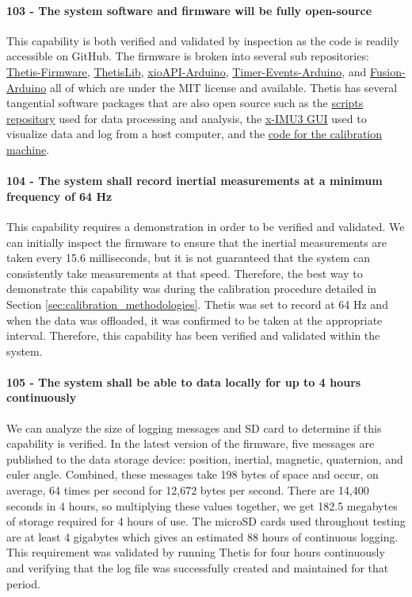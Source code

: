\paragraph*{103 - The system software and firmware will be fully open-source} This capability is both verified and validated by inspection as the code is readily accessible on GitHub.
The firmware is broken into several sub repositories: \href{https://github.com/Legohead259/Thetis-Firmware}{Thetis-Firmware}, \href{https://github.com/Legohead259/ThetisLib}{ThetisLib}, \href{https://github.com/Legohead259/xioAPI-Arduino}{xioAPI-Arduino}, \href{https://github.com/Legohead259/Timer-Events-Arduino}{Timer-Events-Arduino}, and \href{https://github.com/Legohead259/Fusion-Arduino}{Fusion-Arduino} all of which are under the MIT license and available.
Thetis has several tangential software packages that are also open source such as the \href{https://github.com/Legohead259/Thetis-Scripts}{scripts repository} used for data processing and analysis, the \href{https://github.com/xioTechnologies/x-IMU3-Software}{x-IMU3 GUI} used to visualize data and log from a host computer, and the \href{https://github.com/Legohead259/Thetis-Calibration}{code for the calibration machine}.

\paragraph*{104 - The system shall record inertial measurements at a minimum frequency of 64 Hz} This capability requires a demonstration in order to be verified and validated.
We can initially inspect the firmware to ensure that the inertial measurements are taken every 15.6 milliseconds, but it is not guaranteed that the system can consistently take measurements at that speed.
Therefore, the best way to demonstrate this capability was during the calibration procedure detailed in Section \ref{sec:calibration_methodologies}.
Thetis was set to record at 64 Hz and when the data was offloaded, it was confirmed to be taken at the appropriate interval.
Therefore, this capability has been verified and validated within the system.

\paragraph*{105 - The system shall be able to data locally for up to 4 hours continuously} We can analyze the size of logging messages and SD card to determine if this capability is verified.
In the latest version of the firmware, five messages are published to the data storage device: position, inertial, magnetic, quaternion, and euler angle.
Combined, these messages take 198 bytes of space and occur, on average, 64 times per second for 12,672 bytes per second.
There are 14,400 seconds in 4 hours, so multiplying these values together, we get 182.5 megabytes of storage required for 4 hours of use.
The microSD cards used throughout testing are at least 4 gigabytes which gives an estimated 88 hours of continuous logging.
This requirement was validated by running Thetis for four hours continuously and verifying that the log file was successfully created and maintained for that period.

